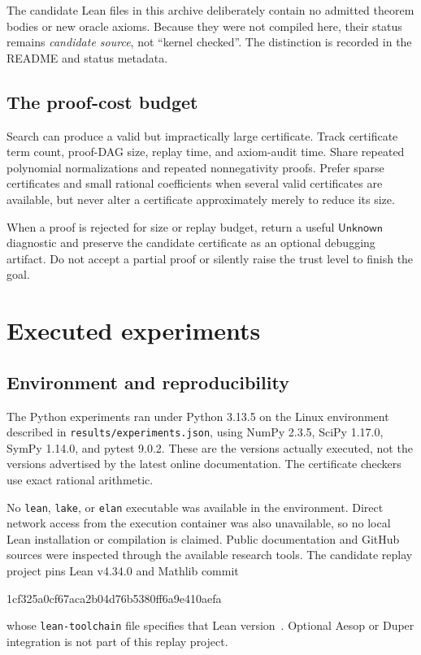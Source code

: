 \documentclass[11pt,a4paper]{article}
\theoremstyle{definition}
\newcommand{\unknown}{\ensuremath{\mathsf{Unknown}}}
\newcommand{\code}[1]{\texttt{#1}}
\begin{document}
The candidate Lean files in this archive deliberately contain no admitted theorem bodies or new oracle axioms. Because they were not compiled here, their status remains \emph{candidate source}, not ``kernel checked''. The distinction is recorded in the README and status metadata.

\subsection{The proof-cost budget}

Search can produce a valid but impractically large certificate. Track certificate term count, proof-DAG size, replay time, and axiom-audit time. Share repeated polynomial normalizations and repeated nonnegativity proofs. Prefer sparse certificates and small rational coefficients when several valid certificates are available, but never alter a certificate approximately merely to reduce its size.

When a proof is rejected for size or replay budget, return a useful \unknown{} diagnostic and preserve the candidate certificate as an optional debugging artifact. Do not accept a partial proof or silently raise the trust level to finish the goal.

\section{Executed experiments}

\subsection{Environment and reproducibility}

The Python experiments ran under Python 3.13.5 on the Linux environment described in \code{results/experiments.json}, using NumPy 2.3.5, SciPy 1.17.0, SymPy 1.14.0, and pytest 9.0.2. These are the versions actually executed, not the versions advertised by the latest online documentation. The certificate checkers use exact rational arithmetic.

No \code{lean}, \code{lake}, or \code{elan} executable was available in the environment. Direct network access from the execution container was also unavailable, so no local Lean installation or compilation is claimed. Public documentation and GitHub sources were inspected through the available research tools. The candidate replay project pins Lean v4.34.0 and Mathlib commit
\begin{center}\small\ttfamily
1cf325a0cf67aca2b04d76b5380ff6a9e410aefa
\end{center}
whose \code{lean-toolchain} file specifies that Lean version~\cite{mathlibpin}. Optional Aesop or Duper integration is not part of this replay project.
\end{document}
